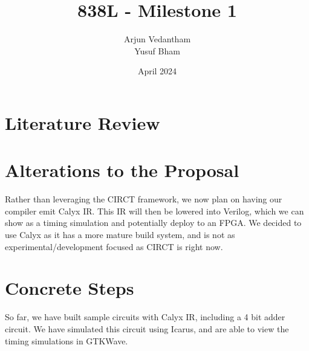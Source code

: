 \documentclass{article}
\title{838L - Milestone 1}
\author{Arjun Vedantham \\ Yusuf Bham}
\date{April 2024}
\begin{document}
\maketitle

\section{Literature Review}

\section{Alterations to the Proposal}
Rather than leveraging the CIRCT framework, we now plan on having our compiler emit Calyx IR. This IR will then be lowered into Verilog, which we can show
as a timing simulation and potentially deploy to an FPGA. We decided to use Calyx as it has a more mature build system, and is not as experimental/development
focused as CIRCT is right now.
\section{Concrete Steps}
So far, we have built sample circuits with Calyx IR, including a 4 bit adder circuit. We have simulated this circuit using Icarus, and are able to view the timing
simulations in GTKWave. %
\end{document}
